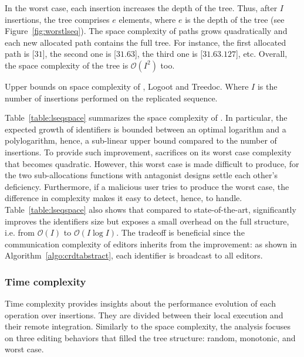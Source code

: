 In the worst case, each insertion increases the depth of the tree. Thus, after
$I$ insertions, the tree comprises $e$ elements, where $e$ is the depth of the
tree (see Figure~\ref{fig:worstlseq}). The space complexity of paths grows
quadratically and each new allocated path contains the full tree. For instance,
the first allocated path is [$31$], the second one is [$31.63$], the third one
is [$31.63.127$], etc.  Overall, the space complexity of the tree is
$\mathcal{O}(I^2)$ too.

\begin{table}
  \caption{\label{table:lseqspace}
    Upper bounds on space complexity of \LSEQ, Logoot and Treedoc. Where
    $I$ is the number of insertions performed on the replicated sequence.}
  \centering
  
\end{table}

Table~\ref{table:lseqspace} summarizes the space complexity of \LSEQ. In
particular, the expected growth of identifiers is bounded between an optimal
logarithm and a polylogarithm, hence, a sub-linear upper bound compared to the
number of insertions. To provide such improvement, \LSEQ sacrifices on its worst
case complexity that becomes quadratic. However, this worst case is made
difficult to produce, for the two sub-allocations functions with antagonist
designs settle each other's deficiency. Furthermore, if a malicious user tries
to produce the worst case, the difference in complexity makes it easy to detect,
hence, to handle. Table~\ref{table:lseqspace} also shows that compared to
state-of-the-art, \LSEQ significantly improves the identifiers size but exposes
a small overhead on the full structure, i.e. from $\mathcal{O}(I)$ to
$\mathcal{O}(I\log I)$. The tradeoff is beneficial since the communication
complexity of editors inherits from the improvement: as shown in
Algorithm~\ref{algo:crdtabstract}, each identifier is broadcast to all editors.

\subsubsection{Time complexity}
\label{subsubsec:time}

Time complexity provides insights about the performance evolution of each
operation over insertions. They are divided between their local execution and
their remote integration.  Similarly to the space complexity, the analysis
focuses on three editing behaviors that filled the tree structure: random,
monotonic, and worst case.

